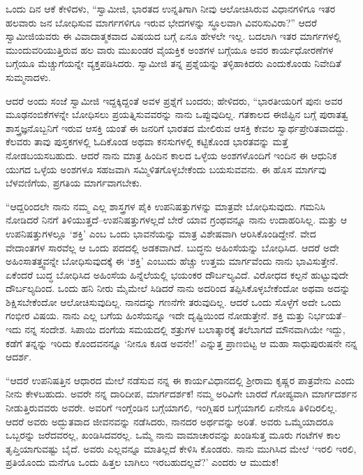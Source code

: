 ಒಂದು ದಿನ ಆಕೆ ಕೇಳಿದಳು, “ಸ್ವಾಮೀಜಿ, ಭಾರತದ ಉನ್ನತಿಗಾಗಿ ನೀವು ಆಲೋಚಿಸಿರುವ ವಿಧಾನಗಳಿಗೂ ಇತರ ಹಲವಾರು ಜನ ಬೋಧಿಸುವ ಮಾರ್ಗಗಳಿಗೂ ಇರುವ ಭೇದಗಳನ್ನು ಸ್ಥೂಲವಾಗಿ ವಿವರಿಸುವಿರಾ?” ಆದರೆ ಸ್ವಾಮೀಜಿಯವರು ಈ ವಿವಾದಾತ್ಮಕವಾದ ವಿಷಯದ ಬಗ್ಗೆ ಏನೂ ಹೇಳಲೇ ಇಲ್ಲ. ಬದಲಾಗಿ ಇತರ ಮಾರ್ಗಗಳಲ್ಲಿ ಮುಂದುವರಿಯುತ್ತಿರುವ ಹಲ ವಾರು ಮುಖಂಡರ ವೈಯಕ್ತಿಕ ಅಂಶಗಳ ಬಗ್ಗೆಯೂ ಅವರ ಕಾರ್ಯಧೋರಣೆಗಳ ಬಗ್ಗೆಯೂ ಮೆಚ್ಚುಗೆಯನ್ನೇ ವ್ಯಕ್ತಪಡಿಸಿದರು. ಸ್ವಾಮೀಜಿ ತನ್ನ ಪ್ರಶ್ನೆಯನ್ನು ತಳ್ಳಿಹಾಕಿದರು ಎಂದುಕೊಂಡು ನಿವೇದಿತೆ ಸುಮ್ಮನಾದಳು.

ಆದರೆ ಅಂದು ಸಂಜೆ ಸ್ವಾಮೀಜಿ ಇದ್ದಕ್ಕಿದ್ದಂತೆ ಅವಳ ಪ್ರಶ್ನೆಗೆ ಬಂದರು; ಹೇಳಿದರು, “ಭಾರತೀಯರಿಗೆ ಪುನಃ ಅವರ ಮೂಢನಂಬಿಕೆಗಳನ್ನೇ ಬೋಧಿಸಲು ಪ್ರಯತ್ನಿಸುವವರನ್ನು ನಾನು ಒಪ್ಪುವುದಿಲ್ಲ. ಗತಕಾಲದ ಈಜಿಪ್ಟಿನ ಬಗ್ಗೆ ಪುರಾತತ್ವ ಶಾಸ್ತ್ರಜ್ಞನೊಬ್ಬನಿಗೆ ಇರುವ ಆಸಕ್ತಿ ಯಂತೆ ಈ ಜನರಿಗೆ ಭಾರತದ ಮೇಲಿರುವ ಆಸಕ್ತಿ ಕೇವಲ ಸ್ವಾರ್ಥಪ್ರೇರಿತವಾದದ್ದು. ಕೆಲವರು ತಾವು ಪುಸ್ತಕಗಳಲ್ಲಿ ಓದಿಕೊಂಡ ಅಥವಾ ಕನಸುಗಳಲ್ಲಿ ಕಟ್ಟಿಕೊಂಡ ಭಾರತವನ್ನು ಮತ್ತೆ ನೋಡಬಯಸಬಹುದು. ಆದರೆ ನಾನು ಮಾತ್ರ ಹಿಂದಿನ ಕಾಲದ ಒಳ್ಳೆಯ ಅಂಶಗಳೊಂದಿಗೆ ಇಂದಿನ ಈ ಆಧುನಿಕ ಯುಗದ ಒಳ್ಳೆಯ ಅಂಶಗಳೂ ಸಹಜವಾಗಿ ಸಮ್ಮಿಳಿತಗೊಳ್ಳಬೇಕೆಂದು ಬಯಸುವವನು. ಈ ಹೊಸ ಮಾರ್ಗವು ಬೆಳವಣಿಗೆಯ, ಪ್ರಗತಿಯ ಮಾರ್ಗವಾಗಬೇಕು.

“ಆದ್ದರಿಂದಲೇ ನಾನು ನಮ್ಮ ಎಲ್ಲ ಶಾಸ್ತ್ರಗಳ ಪೈಕಿ ಉಪನಿಷತ್ತುಗಳನ್ನು ಮಾತ್ರವೇ ಬೋಧಿಸುವುದು. ಗಮನಿಸಿ ನೋಡಿದರೆ ನಿನಗೆ ತಿಳಿಯುತ್ತದೆ–ಉಪನಿಷತ್ತುಗಳಲ್ಲದೆ ಬೇರೆ ಯಾವ ಗ್ರಂಥವನ್ನೂ ನಾನು ಉದಾಹರಿಸಿಲ್ಲ. ಮತ್ತು ಆ ಉಪನಿಷತ್ತುಗಳಲ್ಲೂ ‘ಶಕ್ತಿ’ ಎಂಬ ಒಂದು ಭಾವನೆಯನ್ನು ಮಾತ್ರ ವಿಶೇಷವಾಗಿ ಆರಿಸಿಕೊಂಡಿದ್ದೇನೆ. ವೇದ ವೇದಾಂತಗಳ ಸಾರವೆಲ್ಲ ಆ ಒಂದು ಪದದಲ್ಲಿ ಅಡಕವಾಗಿದೆ. ಬುದ್ಧನು ಅಹಿಂಸೆಯನ್ನು ಬೋಧಿಸಿದ. ಆದರೆ ಅದೇ ಅಹಿಂಸಾತತ್ತ್ವವನ್ನೇ ಬೋಧಿಸುವುದಕ್ಕೆ ಈ ‘ಶಕ್ತಿ’ ಎಂಬುದು ಹೆಚ್ಚು ಉತ್ತಮ ಮಾರ್ಗವೆಂದು ನಾನು ಭಾವಿಸುತ್ತೇನೆ. ಏಕೆಂದರೆ ಬುದ್ಧ ಬೋಧಿಸಿದ ಅಹಿಂಸೆಯ ಹಿನ್ನೆಲೆಯಲ್ಲಿ ಭಯಂಕರ ದೌರ್ಬಲ್ಯವಿದೆ. ವಿರೋಧದ ಕಲ್ಪನೆ ಹುಟ್ಟುವುದೇ ದೌರ್ಬಲ್ಯದಿಂದ. ಒಂದು ಹನಿ ನೀರು ಮೈಮೇಲೆ ಸಿಡಿದರೆ ನಾನು ಅದರಿಂದ ತಪ್ಪಿಸಿಕೊಳ್ಳಬೇಕೆಂದೋ ಅಥವಾ ಅದನ್ನು ಶಿಕ್ಷಿಸಬೇಕೆಂದೋ ಆಲೋಚಿಸುವುದಿಲ್ಲ. ನಾನದನ್ನು ಗಣನೆಗೇ ತರುವುದಿಲ್ಲ. ಆದರೆ ಒಂದು ಸೊಳ್ಳೆಗೆ ಅದೇ ಒಂದು ಗಂಭೀರ ವಿಷಯ. ನಾನು ಎಲ್ಲ ಬಗೆಯ ಹಿಂಸೆಯನ್ನೂ ಇದೇ ದೃಷ್ಟಿಯಿಂದ ನೋಡುತ್ತೇನೆ. ಶಕ್ತಿ ಮತ್ತು ನಿರ್ಭಯತೆ–ಇದು ನನ್ನ ಸಂದೇಶ. ಸಿಪಾಯಿ ದಂಗೆಯ ಸಮಯದಲ್ಲಿ ಶತ್ರುಗಳ ಬಲಾತ್ಕಾರಕ್ಕೆ ತಲೆಬಾಗದೆ ಮೌನವಾಗಿಯೇ ಇದ್ದು, ಕಡೆಗೆ ತನ್ನನ್ನು ಇರಿದು ಕೊಂದವನನ್ನೂ ‘ನೀನೂ ಕೂಡ ಅವನೇ!’ ಎನ್ನುತ್ತ ಪ್ರಾಣಬಿಟ್ಟ ಆ ಮಹಾ ಸಾಧುಪುರುಷನೇ ನನ್ನ ಆದರ್ಶ.

“ಆದರೆ ಉಪನಿಷತ್ತಿನ ಆಧಾರದ ಮೇಲೆ ನಡೆಸುವ ನನ್ನ ಈ ಕಾರ್ಯವಿಧಾನದಲ್ಲಿ ಶ್ರೀರಾಮ ಕೃಷ್ಣರ ಪಾತ್ರವೇನು ಎಂದು ನೀನು ಕೇಳಬಹುದು. ಅವರೇ ನನ್ನ ದಾರಿದೀಪ, ಮಾರ್ಗದರ್ಶಕ! ನಮ್ಮ ಅರಿವಿಗೇ ಬಾರದೆ ಗೋಪ್ಯವಾಗಿ ಮಾರ್ಗದರ್ಶನ ನೀಡುತ್ತಿರುವವರು ಅವರೇ. ಅವರಿಗೆ ಇಂಗ್ಲೆಂಡಿನ ಬಗ್ಗೆಯಾಗಲಿ, ಇಂಗ್ಲಿಷರ ಬಗ್ಗೆಯಾಗಲಿ ಏನೇನೂ ತಿಳಿದಿರಲಿಲ್ಲ. ಆದರೆ ಅವರು ಅದ್ಭುತವಾದ ಜೀವನವನ್ನು ನಡೆಸಿದರು, ನಾನದರ ಅರ್ಥವನ್ನು ಅರಿತೆ. ಅವರು ಒಮ್ಮೆಯಾದರೂ ಒಬ್ಬರನ್ನು ಜರೆದವರಲ್ಲ, ಖಂಡಿಸಿದವರಲ್ಲ. ಒಮ್ಮೆ ನಾನು ವಾಮಾಚಾರವನ್ನು ಖಂಡಿಸುತ್ತ ಮೂರು ಗಂಟೆಗಳ ಕಾಲ ತೃಪ್ತಿಯಾಗುವಷ್ಟು ಬೈದೆ. ಅವರು ಎಲ್ಲವನ್ನೂ ಮಾತಿಲ್ಲದೆ ಕೇಳಿಸಿ ಕೊಂಡರು. ನಾನು ಮುಗಿಸಿದ ಮೇಲೆ ‘ಇರಲಿ ಇರಲಿ, ಪ್ರತಿಯೊಂದು ಮನೆಗೂ ಒಂದು ಹಿತ್ತಲ ಬಾಗಿಲು ಇರಬಹುದಲ್ಲವೆ?’ ಎಂದರು ಆ ಮುದುಕ!

